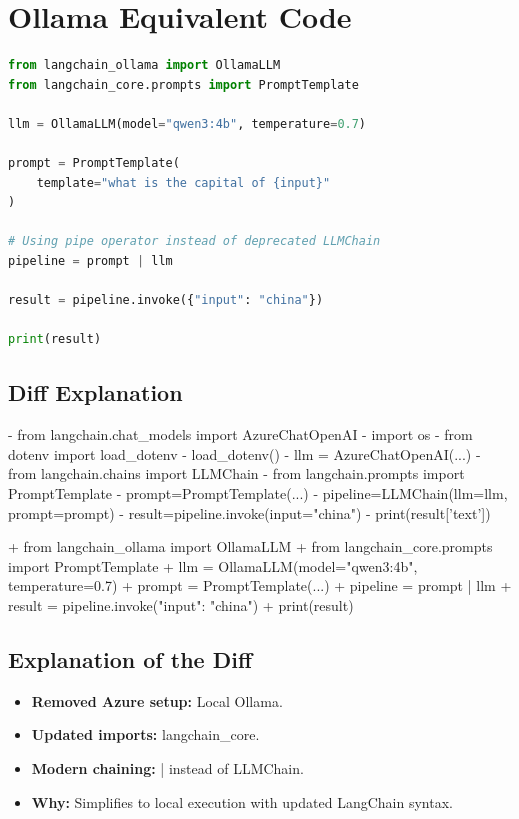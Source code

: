 \documentclass[11pt, a4paper]{article}
\begin{document}
\section{Ollama Equivalent Code}
\begin{lstlisting}[language=Python]
from langchain_ollama import OllamaLLM
from langchain_core.prompts import PromptTemplate

llm = OllamaLLM(model="qwen3:4b", temperature=0.7)

prompt = PromptTemplate(
    template="what is the capital of {input}"
)

# Using pipe operator instead of deprecated LLMChain
pipeline = prompt | llm

result = pipeline.invoke({"input": "china"})

print(result)
\end{lstlisting}

\subsection{Diff Explanation}
\begin{removedcode}
\begin{diffverb}
- from langchain.chat_models import AzureChatOpenAI
- import os
- from dotenv import load_dotenv
- load_dotenv()
- llm = AzureChatOpenAI(...)
- from langchain.chains import LLMChain
- from langchain.prompts import PromptTemplate
- prompt=PromptTemplate(...)
- pipeline=LLMChain(llm=llm, prompt=prompt)
- result=pipeline.invoke(input="china")
- print(result['text'])
\end{diffverb}
\end{removedcode}

\begin{addedcode}
\begin{diffverb}
+ from langchain_ollama import OllamaLLM
+ from langchain_core.prompts import PromptTemplate
+ llm = OllamaLLM(model="qwen3:4b", temperature=0.7)
+ prompt = PromptTemplate(...)
+ pipeline = prompt | llm
+ result = pipeline.invoke({"input": "china"})
+ print(result)
\end{diffverb}
\end{addedcode}


\subsection{Explanation of the Diff}
\begin{itemize}
    \item \textbf{Removed Azure setup:} Local Ollama.
    \item \textbf{Updated imports:} langchain\_core.
    \item \textbf{Modern chaining:} | instead of LLMChain.
    \item \textbf{Why:} Simplifies to local execution with updated LangChain syntax.
\end{itemize}
\end{document}
